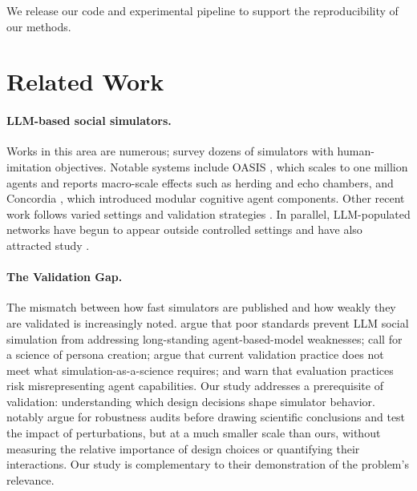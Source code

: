 \documentclass[letterpaper]{article} %
\begin{document}
We release our code and experimental pipeline to support the reproducibility of our methods.

\section{Related Work}


\paragraph{LLM-based social simulators.} Works in this area are numerous; \citet{larooij2025largelanguagemodelssolve} survey dozens of simulators with human-imitation objectives. Notable systems include OASIS \citep{yang2025oasisopenagentsocial}, which scales to one million agents and reports macro-scale effects such as herding and echo chambers, and Concordia \citep{vezhnevets2023generative}, which introduced modular cognitive agent components. Other recent work follows varied settings and validation strategies \citep{zheng2026rolesimllm,lu2026real,yuzhe2026twinmarket}. In parallel, LLM-populated networks have begun to appear outside controlled settings and have also attracted study \citep{sodano2026emergencefragilityllmbasedsocial,jiang2026humans,holtz2026anatomy}.

\paragraph{The Validation Gap.} The mismatch between how fast simulators are published and how weakly they are validated is increasingly noted. \citet{larooij2025largelanguagemodelssolve} argue that poor standards prevent LLM social simulation from addressing long-standing agent-based-model weaknesses; \citet{li2025llmgeneratedpersonapromise} call for a science of persona creation; \citet{li2026positionaiagentsyet} argue that current validation practice does not meet what simulation-as-a-science requires; and \citet{seshadri2026lost} warn that evaluation practices risk misrepresenting agent capabilities. Our study addresses a prerequisite of validation: understanding which design decisions shape simulator behavior. \citet{ye2026stopdrawingscientificclaims} notably argue for robustness audits before drawing scientific conclusions and test the impact of perturbations, but at a much smaller scale than ours, without measuring the relative importance of design choices or quantifying their interactions. Our study is complementary to their demonstration of the problem's relevance.
\end{document}
